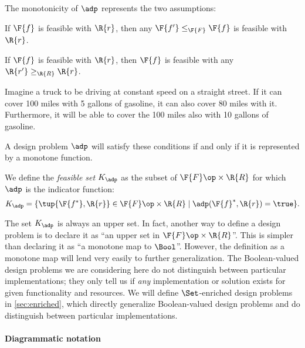 The monotonicity of $\adp$ represents the two assumptions:

\begin{compactenum}
\item If $\F{f}$ is feasible with $\R{r}$, then any $\F{f'} \leq_\F{F} \F{f}$ is feasible with $\R{r}$.
\item If $\F{f}$ is feasible with $\R{r}$, then $\F{f}$ is feasible with any $\R{r'} \geq_\R{R} \R{r}$.
\end{compactenum}

\begin{example}
Imagine a truck to be driving at constant speed on a straight street. If it can cover 100 miles with 5 gallons of gasoline, it can also cover 80 miles with it. Furthermore, it will be able to cover the 100 miles also with 10 gallons of gasoline.
\end{example}

A design problem $\adp$ will satisfy these conditions if and only if it is represented by a monotone function.  %

We define the \emph{feasible set} $K_\adp$ as the subset of $\F{F} \op\times \R{R}$ for which~$\adp$ is the indicator function:
\begin{equation}
    K_\adp = \{ \tup{\F{f^*},\R{r}} \in \F{F} \op\times \R{R}  \mid
            \adp(\F{f}^*, \R{r}) = \true
                \}.
\end{equation}

The set $K_\adp$ is always an upper set. In fact, another way to define a design problem is to declare it as ``an upper
set in $\F{F}\op \times \R{R}$''. This is simpler than declaring it as ``a monotone map to $\Bool$''. However, the
definition as a monotone map will lend very easily to further generalization. The Boolean-valued design problems we are considering here do not distinguish between particular implementations; they only tell us if \emph{any} implementation or solution exists for given functionality and resources. We will define $\Set$-enriched design problems in \cref{sec:enriched}, which directly generalize Boolean-valued design problems and do distinguish between particular implementations.

\paragraph{Diagrammatic notation}

